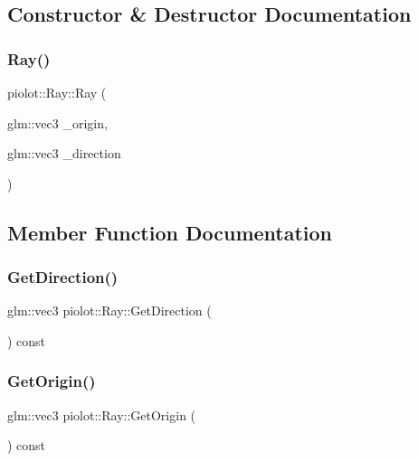 \subsection{Constructor \& Destructor Documentation}
\mbox{\label{classpiolot_1_1_ray_a800439dfd7597c519c4e6d5b6336a655}} 
\subsubsection{\texorpdfstring{Ray()}{Ray()}}
{\footnotesize\ttfamily piolot\+::\+Ray\+::\+Ray (\begin{DoxyParamCaption}\item[{glm\+::vec3}]{\+\_\+origin,  }\item[{glm\+::vec3}]{\+\_\+direction }\end{DoxyParamCaption})\hspace{0.3cm}{\ttfamily [explicit]}}



\subsection{Member Function Documentation}
\mbox{\label{classpiolot_1_1_ray_a6dc423ac6188032c31b72279c14bbe98}} 
\subsubsection{\texorpdfstring{Get\+Direction()}{GetDirection()}}
{\footnotesize\ttfamily glm\+::vec3 piolot\+::\+Ray\+::\+Get\+Direction (\begin{DoxyParamCaption}{ }\end{DoxyParamCaption}) const\hspace{0.3cm}{\ttfamily [inline]}}

\mbox{\label{classpiolot_1_1_ray_aaf69eb0891c1e0e884eba2475707a12e}} 
\subsubsection{\texorpdfstring{Get\+Origin()}{GetOrigin()}}
{\footnotesize\ttfamily glm\+::vec3 piolot\+::\+Ray\+::\+Get\+Origin (\begin{DoxyParamCaption}{ }\end{DoxyParamCaption}) const\hspace{0.3cm}{\ttfamily [inline]}}

